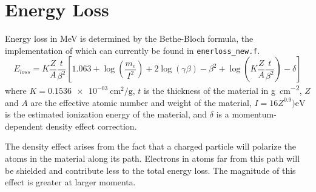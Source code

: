 \section{Energy Loss}
Energy loss in \si{\mega\electronvolt} is determined by the Bethe-Bloch formula,
the implementation of which can currently be found in \texttt{enerloss\_new.f}.
\begin{equation}
 E_{loss} =  K \frac{Z}{A} \frac{t}{\beta^2}
             \left[
                1.063
                + \log\left(\frac{m_e}{I^2}\right)
                + 2 \log(\gamma\beta)
                - \beta^2
                + \log\left(K\frac{Z}{A}\frac{t}{\beta^2}\right)
                - \delta
             \right]
\end{equation}
where
$K=\SI{0.1536e-03}{\centi\meter\squared\per\gram}$,
$t$ is the thickness of the material in \si{\gram\per\centi\meter\squared},
$Z$ and $A$ are the effective atomic number and weight of the material,
$I=16 Z^{0.9}) \si{\electronvolt}$ is the estimated ionization energy of the material,
and $\delta$ is a momentum-dependent density effect correction.

The density effect arises from the fact that a charged particle will polarize
the atoms in the material along its path.
Electrons in atoms far from this path will be shielded and contribute less to
the total energy loss.
The magnitude of this effect is greater at larger momenta.

